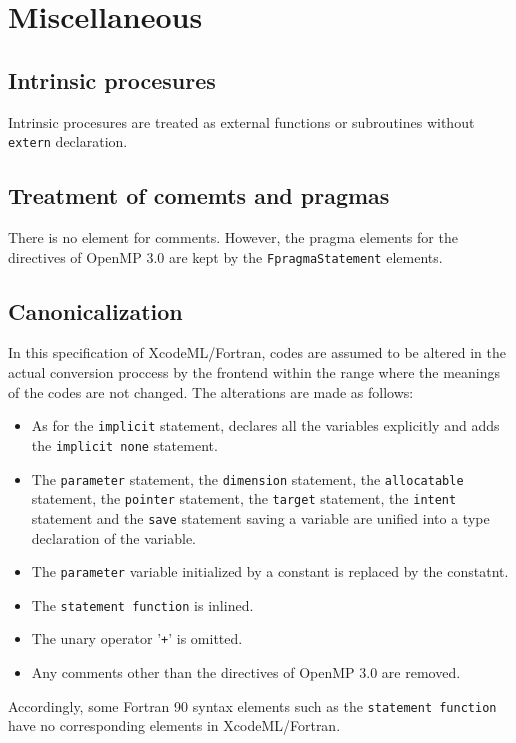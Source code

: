 \section{Miscellaneous}

\subsection{Intrinsic procesures}

Intrinsic procesures are treated as external functions or subroutines
without {\tt extern} declaration.


\subsection{Treatment of comemts and pragmas}

There is no element for comments. However, the pragma elements for the directives
of OpenMP 3.0 are kept by the {\tt FpragmaStatement} elements.


\subsection{Canonicalization}

In this specification of XcodeML/Fortran, codes are assumed to be altered in the actual
conversion proccess by the frontend within the range where the meanings of the codes are not changed.
The alterations are made as follows:

\begin{itemize}
\item As for the {\tt implicit} statement, declares all the variables explicitly and adds the {\tt implicit none} statement.
\item The {\tt parameter} statement, the {\tt dimension} statement, the {\tt allocatable} statement,
the {\tt pointer} statement, the {\tt target} statement, the {\tt intent} statement and the {\tt save} statement
saving a variable are unified into a type declaration of the variable.
\item The {\tt parameter} variable initialized by a constant is replaced by the constatnt.
\item The {\tt statement function} is inlined.
\item The unary operator '{\tt +}' is omitted.
\item Any comments other than the directives of OpenMP 3.0 are removed.
\end{itemize}

Accordingly, some Fortran 90 syntax elements such as the {\tt statement function} have no corresponding elements in XcodeML/Fortran.

